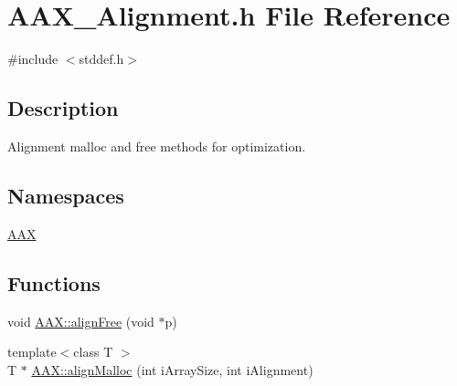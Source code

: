 \hypertarget{a00749}{}\section{A\+A\+X\+\_\+\+Alignment.\+h File Reference}
\label{a00749}
{\ttfamily \#include $<$stddef.\+h$>$}\newline


\subsection{Description}
Alignment malloc and free methods for optimization. 

\subsection*{Namespaces}
\begin{DoxyCompactItemize}
\item 
 \mbox{\hyperlink{a00852}{A\+AX}}
\end{DoxyCompactItemize}
\subsection*{Functions}
\begin{DoxyCompactItemize}
\item 
void \mbox{\hyperlink{a00852_aa7d7e69902012a6272de3ea9aa0264a9}{A\+A\+X\+::align\+Free}} (void $\ast$p)
\item 
{\footnotesize template$<$class T $>$ }\\T $\ast$ \mbox{\hyperlink{a00852_aaa3236d90a0dbbf30150d8a181f2d66b}{A\+A\+X\+::align\+Malloc}} (int i\+Array\+Size, int i\+Alignment)
\end{DoxyCompactItemize}
